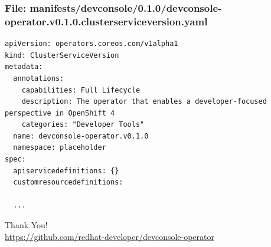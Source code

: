 \documentclass[aspectratio=169]{beamer}
\begin{document}
\begin{frame}[fragile]

  \frametitle{File: manifests/devconsole/0.1.0/devconsole-operator.v0.1.0.clusterserviceversion.yaml}
  
  \begin{Verbatim}[fontsize=\small]
apiVersion: operators.coreos.com/v1alpha1
kind: ClusterServiceVersion
metadata:
  annotations:
    capabilities: Full Lifecycle
    description: The operator that enables a developer-focused perspective in OpenShift 4
    categories: "Developer Tools"
  name: devconsole-operator.v0.1.0
  namespace: placeholder
spec:
  apiservicedefinitions: {}
  customresourcedefinitions:

  ...
  \end{Verbatim}
\end{frame}

\begin{frame}
  \begin{center}
    {\huge Thank You!}\\[1cm]
    \url{https://github.com/redhat-developer/devconsole-operator}
  \end{center}
\end{frame}
\end{document}
